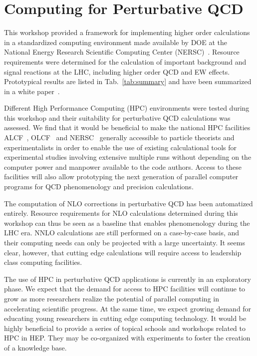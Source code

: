  
\section{Computing for Perturbative QCD}
\label{chap:PQCD}


This workshop provided a framework for implementing higher order  
calculations in a standardized computing environment made available 
by DOE at the National Energy Research Scientific Computing Center
(NERSC)~\cite{NERSC}.  Resource requirements were determined for the
calculation of important background and signal reactions at the
LHC, including higher order QCD and EW effects. Prototypical results 
are listed in Tab.~\ref{tab:summary} and have been summarized in a 
white paper~\cite{HPCWP}.

Different High Performance Computing (HPC) environments were tested
during this workshop and their suitability for perturbative QCD calculations 
was assessed. We find that it would be beneficial to make the national HPC 
facilities ALCF~\cite{ALCF}, OLCF~\cite{OLCF} and NERSC~\cite{NERSC} 
generally accessible to particle theorists and
experimentalists in order to enable the use of existing
calculational tools for experimental studies involving extensive
multiple runs without depending on the computer power and manpower
available to the code authors. Access to these facilities will also
allow prototyping the next generation of parallel computer programs
for QCD phenomenology and precision calculations.

The computation of NLO corrections in perturbative QCD has been automatized 
entirely. Resource requirements for NLO calculations determined during 
this workshop can thus be seen as a baseline that enables phenomenology 
during the LHC era. NNLO calculations are still performed 
on a case-by-case basis, and their computing needs can only be 
projected with a large uncertainty. It seems clear, however, that cutting edge 
calculations will require access to leadership class computing facilities.

The use of HPC in perturbative QCD applications is currently in
an exploratory phase. We expect that the demand for access to HPC
facilities will continue to grow as more researchers realize the 
potential of parallel computing in accelerating scientific progress. 
At the same time, we expect growing demand for educating young researchers 
in cutting edge computing technology. It would be highly beneficial 
to provide a series of topical schools and workshops related 
to HPC in HEP. They may be co-organized with experiments to foster 
the creation of a knowledge base.

